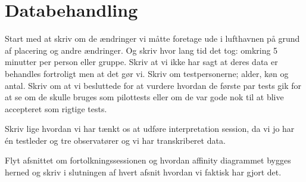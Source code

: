 \chapter{Databehandling}
\label{ParametreDatabehandling}
%
Start med at skriv om de ændringer vi måtte foretage ude i lufthavnen på grund af placering og andre ændringer. Og skriv hvor lang tid det tog: omkring 5 minutter per person eller gruppe. Skriv at vi ikke har sagt at deres data er behandles fortroligt men at det gør vi.  Skriv om testpersonerne; alder, køn og antal. Skriv om at vi besluttede for at vurdere hvordan de første par tests gik for at se om de skulle bruges som pilottests eller om de var gode nok til at blive accepteret som rigtige tests. 


Skriv lige hvordan vi har tænkt os at udføre interpretation session, da vi jo har én testleder og tre observatører og vi har transkriberet data. 

Flyt afsnittet om fortolkningssessionen og hvordan affinity diagrammet bygges herned og skriv i slutningen af hvert afsnit hvordan vi faktisk har gjort det. 